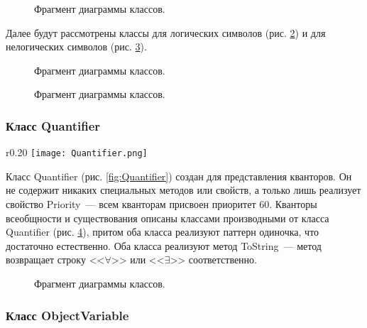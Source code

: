 \begin{figure}[h]
    \caption{Фрагмент диаграммы классов.}
    \label{fig:Symbol-inh}
\end{figure}

Далее будут рассмотрены классы для логических символов (рис. \ref{fig:LogicalSymbol}) и для нелогических символов (рис. \ref{fig:NonLogicalSymbol}).

\begin{figure}[h]
    \caption{Фрагмент диаграммы классов.}
    \label{fig:LogicalSymbol}
\end{figure}

\begin{figure}[ht]
    \caption{Фрагмент диаграммы классов.}
    \label{fig:NonLogicalSymbol}
\end{figure}

\subsubsection{Класс Quantifier}

\begin{wrapfigure}{r}{0.20\textwidth}
    \texttt{[image: Quantifier.png]} 
    \caption{}
    \label{fig:Quantifier}
\end{wrapfigure}

Класс Quantifier (рис. \ref{fig:Quantifier}) создан для представления кванторов. Он не содержит никаких специальных методов или свойств, а только лишь реализует свойство Priority~--- всем кванторам присвоен приоритет 60. Кванторы всеобщности и существования описаны классами производными от класса Quantifier (рис. \ref{fig:Quantifier-inh}), притом оба класса реализуют паттерн одиночка, что достаточно естественно. Оба класса реализуют метод ToString~--- метод возвращает строку <<$\forall$>> или <<$\exists$>> соответственно.

\begin{figure}[h]
    \caption{Фрагмент диаграммы классов.}
    \label{fig:Quantifier-inh}
\end{figure}


\subsubsection{Класс ObjectVariable}

